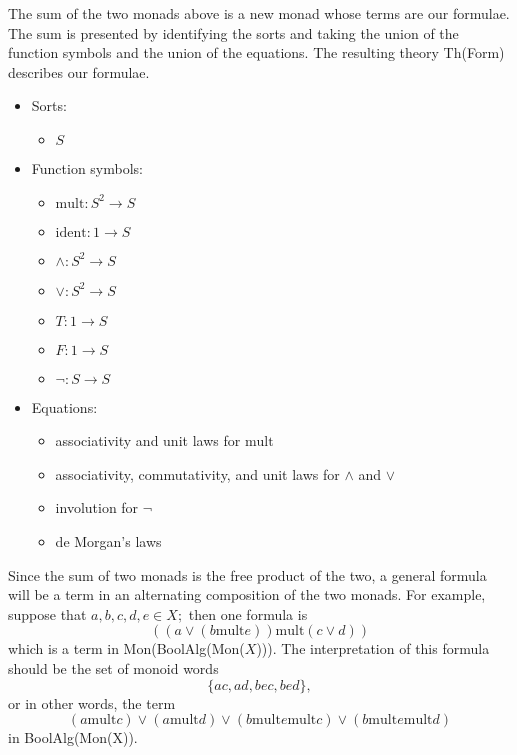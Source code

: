 \documentclass{article}
\newcommand{\maps}{\colon}
\newcommand{\mult}{\mathrm{mult}}
\newcommand{\ident}{\mathrm{ident}}
\begin{document}
The sum of the two monads above is a new monad whose terms are our formulae.  The sum is presented by identifying the sorts and taking the union of the function symbols and the union of the equations.  The resulting theory Th(Form) describes our formulae.
\begin{center}
  \begin{itemize}
    \item Sorts:
    \begin{itemize}
      \item $S$
    \end{itemize}
    \item Function symbols:
    \begin{itemize}
      \item $\mult\maps S^2 \to S$
      \item $\ident\maps 1 \to S$
      \item $\land\maps S^2 \to S$
      \item $\lor\maps S^2 \to S$
      \item $T\maps 1 \to S$
      \item $F\maps 1 \to S$
      \item $\neg\maps S \to S$
    \end{itemize}
    \item Equations:
    \begin{itemize}
      \item associativity and unit laws for $\mult$
      \item associativity, commutativity, and unit laws for $\land$ and $\lor$
      \item involution for $\neg$
      \item de Morgan's laws
    \end{itemize}
  \end{itemize}
\end{center}
Since the sum of two monads is the free product of the two, a general formula will be a term in an alternating composition of the two monads.  For example, suppose that $a, b, c, d, e \in X;$ then one formula is
\[ (({a}\lor{(b \mult e)}) \mult ({c}\lor{d})) \]
which is a term in Mon(BoolAlg(Mon($X$))).  The interpretation of this formula should be the set of monoid words
\[ \{ ac, ad, bec, bed \}, \]
or in other words, the term
\[ (a \mult c) \lor (a \mult d) \lor (b \mult e \mult c) \lor (b \mult e \mult d) \]
in BoolAlg(Mon(X)).
\end{document}
